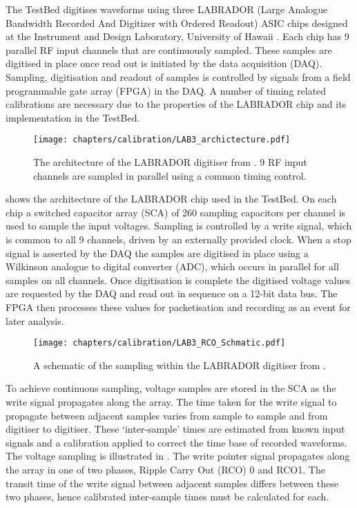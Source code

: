 The TestBed digitises waveforms using three LABRADOR (Large Analogue Bandwidth Recorded And Digitizer with Ordered Readout) ASIC chips designed at the Instrument and Design Laboratory, University of Hawaii \cite{Varner2007447}. Each chip has 9 parallel RF input channels that are continuously sampled. These samples are digitised in place once read out is initiated by the data acquisition (DAQ). Sampling, digitisation and readout of samples is controlled by signals from a field programmable gate array (FPGA) in the DAQ. A number of timing related calibrations are necessary due to the properties of the LABRADOR chip and its implementation in the TestBed. 

\begin{figure}[htpb]
  \texttt{[image: chapters/calibration/LAB3\_archictecture.pdf]}
  \caption{The architecture of the LABRADOR digitiser from \cite{Varner2007447}. 9 RF input channels are sampled in parallel using a common timing control.}
  \label{fig:calibration:LABRADOR-Digitiser-Chip:Architecture}
\end{figure}

 shows the architecture of the LABRADOR chip used in the TestBed. On each chip a switched capacitor array (SCA) of 260 sampling capacitors per channel is used to sample the input voltages. Sampling is controlled by a write signal, which is common to all 9 channels, driven by an externally provided clock. When a stop signal is asserted by the DAQ the samples are digitised in place using a Wilkinson analogue to digital converter (ADC), which occurs in parallel for all samples on all channels. Once digitisation is complete the digitised voltage values are requested by the DAQ and read out in sequence on a 12-bit data bus. The FPGA then processes these values for packetisation and recording as an event for later analysis.

\begin{figure}[htpb]
  \texttt{[image: chapters/calibration/LAB3\_RCO\_Schmatic.pdf]}
  \caption{A schematic of the sampling within the LABRADOR digitiser from \cite{Varner2007447}.}
  \label{fig:calibration:LABRADOR-Digitiser-Chip:Schematic}
\end{figure}


To achieve continuous sampling, voltage samples are stored in the SCA as the write signal propagates along the array. The time taken for the write signal to propagate between adjacent samples varies from sample to sample and from digitiser to digitiser. These `inter-sample' times are estimated from known input signals and a calibration applied to correct the time base of recorded waveforms. The voltage sampling is illustrated in . The write pointer signal propagates along the array in one of two phases, Ripple Carry Out (RCO) 0 and RCO1. The transit time of the write signal between adjacent samples differs between these two phases, hence calibrated inter-sample times must be calculated for each.

